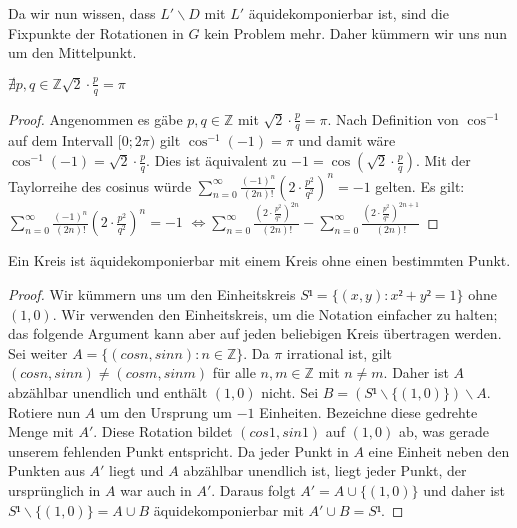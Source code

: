 Da wir nun wissen, dass $L'\backslash D$ mit $L'$ äquidekomponierbar ist, sind die Fixpunkte der Rotationen in $G$ kein Problem mehr.
Daher kümmern wir uns nun um den Mittelpunkt.

\begin{lemma} \label{lemma:ncm_pi_sqrt_2} %
$\nexists p,q\in \mathbb{Z} \sqrt{2}\cdot \frac{p}{q}=\pi$
\leanok
\end{lemma}
\begin{proof}
Angenommen es gäbe $p,q\in \mathbb{Z}$ mit $\sqrt{2}\cdot \frac{p}{q}=\pi$. Nach Definition von $\cos^{-1}$ auf dem Intervall $[0;2\pi)$ gilt $\cos^{-1}(-1)=\pi$ und damit wäre $\cos^{-1}(-1)=
\sqrt{2}\cdot \frac{p}{q}$. Dies ist äquivalent zu $-1=\cos(\sqrt{2}\cdot \frac{p}{q})$. Mit der Taylorreihe des cosinus würde 
$\sum_{n=0}^{\infty}{\frac{(-1)^n}{(2n)!}(2\cdot \frac{p^2}{q^2})^n}=-1$ gelten. Es gilt:\\
$\sum_{n=0}^{\infty}{\frac{(-1)^n}{(2n)!}(2\cdot \frac{p^2}{q^2})^n}=-1$
$\Leftrightarrow \sum_{n=0}^{\infty}\frac{(2\cdot \frac{p^2}{q^2})^{2n}}{(2n)!}-\sum_{n=0}^{\infty}\frac{(2\cdot \frac{p^2}{q^2})^{2n+1}}{(2n)!}$
\end{proof}

\begin{lemma} \label{lemma:aequi_kreis}
Ein Kreis ist äquidekomponierbar mit einem Kreis ohne einen bestimmten Punkt.
 \leanok
\end{lemma}
\begin{proof} 
\leanok
Wir kümmern uns um den Einheitskreis $S¹=\{(x,y):x²+y²=1\}$ ohne ${(1,0)}$. Wir verwenden den Einheitskreis, um die Notation einfacher zu halten; 
das folgende Argument kann aber auf jeden beliebigen Kreis übertragen werden.
Sei weiter $A=\{(cos n,sin n):n\in\mathbb{Z}\}$. Da $\pi$ irrational ist, gilt $(cos n,sin n)\neq (cos m, sin m)$ für alle $n,m\in\mathbb{Z}$
mit $n\neq m$. Daher ist $A$ abzählbar unendlich und enthält $(1,0)$ nicht. Sei $B=(S¹\backslash\{(1,0)\})\backslash A$.
Rotiere nun $A$ um den Ursprung um $-1$ Einheiten. Bezeichne diese gedrehte Menge mit $A'$. Diese Rotation bildet $(cos 1,sin 1)$ auf $(1,0)$
ab, was gerade unserem fehlenden Punkt entspricht. Da jeder Punkt in $A$ eine Einheit neben den Punkten aus $A'$ liegt und $A$ abzählbar unendlich
ist, liegt jeder Punkt, der ursprünglich in $A$ war auch in $A'$. Daraus folgt $A'=A\cup \{(1,0)\}$ und daher ist
$S¹\backslash \{(1,0)\}=A\cup B$ äquidekomponierbar mit $A'\cup B=S¹$.
\end{proof}


